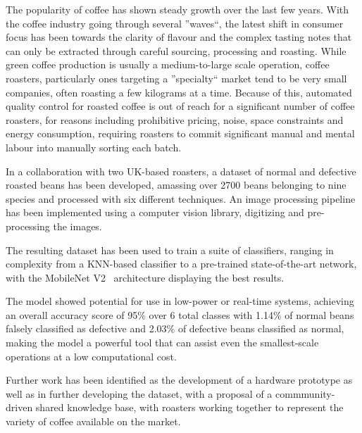 The popularity of coffee has shown steady growth over the last few years.
With the coffee industry going through several ''waves``, the latest shift in consumer focus has been towards
the clarity of flavour and the complex tasting notes that can only be extracted through careful sourcing, processing and roasting.
While green coffee production is usually a medium-to-large scale operation, coffee roasters, particularly ones targeting a
''specialty`` market tend to be very small companies, often roasting a few kilograms at a time.
Because of this, automated quality control for roasted coffee is out of reach for a significant number of coffee roasters,
for reasons including prohibitive pricing, noise, space constraints and energy consumption, requiring roasters to commit
significant manual and mental labour into manually sorting each batch.

In a collaboration with two UK-based roasters, a dataset of normal and defective roasted beans has been developed, amassing
over 2700 beans belonging to nine species and processed with six different techniques.
An image processing pipeline has been implemented using a computer vision library, digitizing and pre-processing the images.

The resulting dataset has been used to train a suite of classifiers, ranging in complexity from a KNN-based classifier to
a pre-trained state-of-the-art network, with the MobileNet V2~\cite{mobileNet} architecture displaying the best results.

The model showed potential for use in low-power or real-time systems, achieving an overall accuracy score of 95\% over 6 total classes with
1.14\% of normal beans falsely classified as defective and 2.03\% of defective beans classified as normal, making the model
a powerful tool that can assist even the smallest-scale operations at a low computational cost.

Further work has been identified as the development of a hardware prototype as well as in further developing the dataset,
with a proposal of a commmunity-driven shared knowledge base, with roasters working together to represent the variety of coffee
available on the market.
